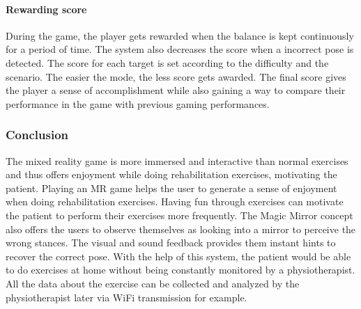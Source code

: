 \paragraph{Rewarding score} During the game, the player gets rewarded when the balance is kept continuously for a period of time. The system also decreases the score when a incorrect pose is detected. 
The score for each target is set according to the difficulty and the scenario. The easier the mode, the less score gets awarded. The final score gives the player a sense of accomplishment while also gaining a way to compare their performance in the game with previous gaming performances. 

\subsubsection{Conclusion}
The mixed reality game is more immersed and interactive than normal exercises and thus offers enjoyment while doing rehabilitation exercises, motivating the patient. Playing an MR game helps the user to generate a sense of enjoyment when doing rehabilitation exercises. Having fun through exercises can motivate the patient to perform their exercises more frequently. The Magic Mirror concept also offers the users to observe themselves as looking into a mirror to perceive the wrong stances. The visual and sound feedback provides them instant hints to recover the correct pose. With the help of this system, the patient would be able to do exercises at home without being constantly monitored by a physiotherapist. All the data about the exercise can be collected and analyzed by the physiotherapist later via WiFi transmission for example.